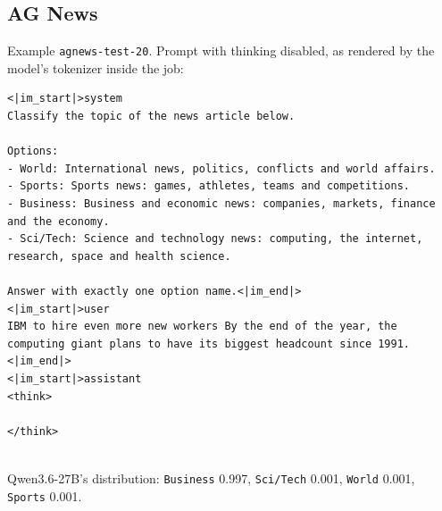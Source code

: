 \subsection*{AG News}
Example \texttt{agnews-test-20}. Prompt with thinking disabled, as rendered by the model's tokenizer inside the job:
\begin{lstlisting}
<|im_start|>system
Classify the topic of the news article below.

Options:
- World: International news, politics, conflicts and world affairs.
- Sports: Sports news: games, athletes, teams and competitions.
- Business: Business and economic news: companies, markets, finance and the economy.
- Sci/Tech: Science and technology news: computing, the internet, research, space and health science.

Answer with exactly one option name.<|im_end|>
<|im_start|>user
IBM to hire even more new workers By the end of the year, the computing giant plans to have its biggest headcount since 1991.<|im_end|>
<|im_start|>assistant
<think>

</think>


\end{lstlisting}
Qwen3.6-27B's distribution: \texttt{Business} 0.997, \texttt{Sci/Tech} 0.001, \texttt{World} 0.001, \texttt{Sports} 0.001.
